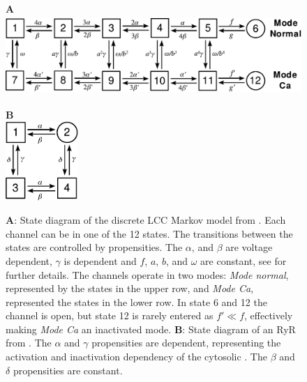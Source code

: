 \renewcommand{\figheight}{3cm}
\begin{figure}[t]
  \centering
  \begin{minipage}{0.79\linewidth}
     \large \textbf{A}\\[0.5em]
    \includegraphics[height=\figheight]{chapters/hake/pdf/Jafri_1998_LCC_model}
  \end{minipage}
  \begin{minipage}{0.2\linewidth}
     \large \textbf{B}\\[0.5em]
    \includegraphics[height=\figheight]{chapters/hake/pdf/Stern_1999_RyR_model}
  \end{minipage}
\caption{\textbf{A}: State diagram of the discrete LCC Markov model from \citet{JafriRiceEtAl1998}. Each channel can be in one of the 12 states.  The transitions between the states are controlled by propensities. The $\alpha$, and $\beta$ are voltage dependent, $\gamma$ is \CaC dependent and $f$, $a$, $b$, and $\omega$ are constant, see \citet{JafriRiceEtAl1998} for further details. The channels operate in two modes: \textit{Mode normal}, represented by the states in the upper row, and \textit{Mode Ca}, represented the states in the lower row. In state 6 and 12 the channel is open, but state 12 is rarely entered as $f'\ll{}f$, effectively making \textit{Mode Ca} an inactivated mode.
\textbf{B}: State diagram of an RyR from \citet{SternSongEtAl1999}. The $\alpha$ and $\gamma$ propensities are \Ca dependent, representing the activation and inactivation dependency of the cytosolic \CaC. The $\beta$ and $\delta$ propensities are constant.}
\label{fig:markov-models}
\end{figure}

